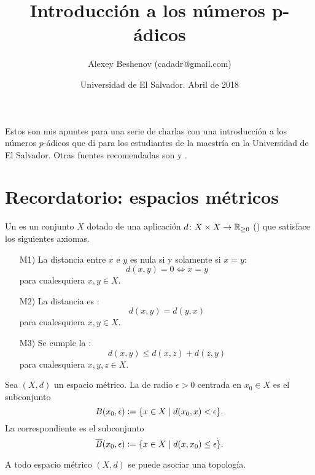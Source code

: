 \documentclass{article}
\author{Alexey Beshenov (cadadr@gmail.com)}
\title{Introducción a los números p-ádicos}
\date{Universidad de El Salvador. Abril de 2018}
\numberwithin{equation}{section}
\theoremstyle{definition}
\begin{document}
{\normalfont\sffamily\bfseries \maketitle}

Estos son mis apuntes para una serie de charlas con una introducción
a los números $p$-ádicos que di para los estudiantes de la maestría
en la Universidad de El Salvador. Otras fuentes recomendadas son
\cite{Koblitz-1984} y \cite{Katok-2007}.

\tableofcontents


\pagebreak
\section{Recordatorio: espacios métricos}

\begin{definicion}
  Un  es un conjunto $X$ dotado de una aplicación
  $d\colon X\times X \to \mathbb{R}_{\ge 0}$ () que satisface
  los siguientes axiomas.

  \begin{enumerate}
  \item[M1)] La distancia entre $x$ e $y$ es nula si y solamente si $x = y$:
    $$d (x,y) = 0 \iff x = y$$
    para cualesquiera $x,y\in X$.

  \item[M2)] La distancia es :
    $$d (x,y) = d (y,x)$$
    para cualesquiera $x,y\in X$.

  \item[M3)] Se cumple la :
    $$d (x,y) \le d (x,z) + d (z,y)$$
    para cualesquiera $x,y,z\in X$.
  \end{enumerate}
\end{definicion}

\begin{definicion}
  Sea $(X,d)$ un espacio métrico. La  de radio $\epsilon > 0$
  centrada en $x_0\in X$ es el subconjunto
  $$B (x_0,\epsilon) \mathrel{\mathop:}= \{ x\in X \mid d (x_0,x) < \epsilon \}.$$
  La  correspondiente es el subconjunto
  $$\overline{B} (x_0,\epsilon) \mathrel{\mathop:}= \{ x\in X \mid d (x,x_0) \le \epsilon \}.$$
\end{definicion}

A todo espacio métrico $(X,d)$ se puede asociar una topología.
\end{document}
